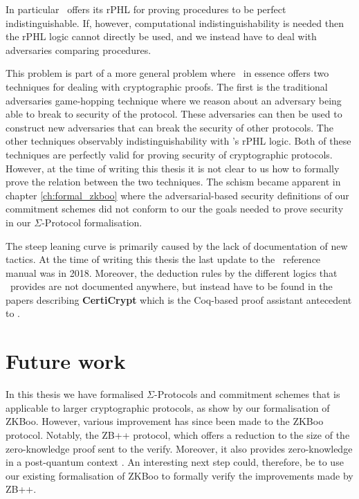 In particular \easycrypt\ offers its rPHL for proving procedures to be perfect
indistinguishable. If, however, computational indistinguishability is needed then
the rPHL logic cannot directly be used, and we instead have to deal with
adversaries comparing procedures.

This problem is part of a more general problem where \easycrypt\ in essence
offers two techniques for dealing with cryptographic proofs. The first is the
traditional adversaries game-hopping technique where we reason about an
adversary being able to break to security of the protocol. These adversaries can
then be used to construct new adversaries that can break the security of other protocols.
The other techniques observably indistinguishability with \easycrypt's rPHL
logic.
Both of these techniques are perfectly valid for proving security of
cryptographic protocols. However, at the time of writing this thesis it is not
clear to us how to formally prove the relation between the two techniques.
The schism became apparent in chapter \ref{ch:formal_zkboo} where the
adversarial-based security definitions of our commitment schemes did not conform
to our the goals needed to prove security in our $\Sigma$-Protocol formalisation.

The steep leaning curve is primarily caused by the lack of documentation of new
tactics. At the time of writing this thesis the last update to the \easycrypt\
reference manual \cite{ec_refman} was in 2018. Moreover, the deduction rules by
the different logics that \easycrypt\ provides are not documented anywhere, but
instead have to be found in the papers describing \textbf{CertiCrypt} which is
the Coq-based proof assistant antecedent to \easycrypt.

\section{Future work}
\label{sec:future_work}
In this thesis we have formalised $\Sigma$-Protocols and
commitment schemes that is applicable to larger cryptographic protocols, as show
by our formalisation of ZKBoo. However, various improvement has since been made to the
ZKBoo protocol. Notably, the ZB++ protocol, which offers a reduction to the
size of the zero-knowledge proof sent to the verify. Moreover, it also provides zero-knowledge
in a post-quantum context \cite{zkb++}. An interesting next step could,
therefore, be to use our existing formalisation of ZKBoo to formally verify the
improvements made by ZB++.

